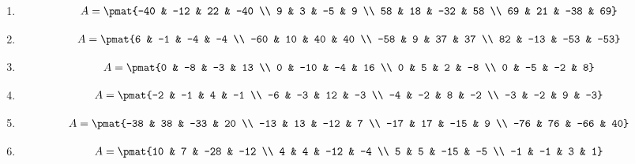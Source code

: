 \begin{enumerate}
\item

\begin{align*}
A = \pmat{-40 & -12 & 22 & -40 \\ 9 & 3 & -5 & 9 \\ 58 & 18 & -32 & 58 \\ 69 & 21 & -38 & 69}
\end{align*}

\item

\begin{align*}
A = \pmat{6 & -1 & -4 & -4 \\ -60 & 10 & 40 & 40 \\ -58 & 9 & 37 & 37 \\ 82 & -13 & -53 & -53}
\end{align*}

\item

\begin{align*}
A = \pmat{0 & -8 & -3 & 13 \\ 0 & -10 & -4 & 16 \\ 0 & 5 & 2 & -8 \\ 0 & -5 & -2 & 8}
\end{align*}

\item

\begin{align*}
A = \pmat{-2 & -1 & 4 & -1 \\ -6 & -3 & 12 & -3 \\ -4 & -2 & 8 & -2 \\ -3 & -2 & 9 & -3}
\end{align*}

\item

\begin{align*}
A = \pmat{-38 & 38 & -33 & 20 \\ -13 & 13 & -12 & 7 \\ -17 & 17 & -15 & 9 \\ -76 & 76 & -66 & 40}
\end{align*}

\item

\begin{align*}
A = \pmat{10 & 7 & -28 & -12 \\ 4 & 4 & -12 & -4 \\ 5 & 5 & -15 & -5 \\ -1 & -1 & 3 & 1}
\end{align*}


\end{enumerate}
